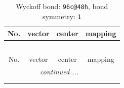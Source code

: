 \documentclass[fleqn,8pt]{jsarticle}
\begin{document}
\renewcommand{\arraystretch}{1.2}
\begin{longtable}{cccc}
\caption{Wyckoff bond: {\tt 96c@48h}, bond symmetry: {\tt 1}}
 \\
 \hline \hline
No. & vector & center & mapping \\ \hline \endfirsthead

\multicolumn{3}{l}{\tablename\ \thetable{}} \\
 \hline \hline
No. & vector & center & mapping \\ \hline \endhead

 \hline \hline
\multicolumn{3}{r}{\footnotesize\it continued ...} \\ \endfoot

 \hline \hline
\multicolumn{3}{r}{} \\ \endlastfoot


\end{longtable}
\end{document}
